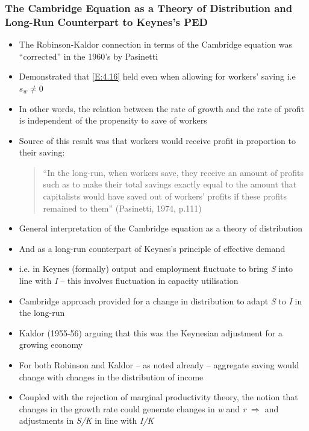 \documentclass[a4paper,twoside]{article}
\numberwithin{equation}{section}
\numberwithin{figure}{section}
\begin{document}
\subsubsection{The Cambridge Equation as a Theory of Distribution and Long-Run Counterpart to Keynes's PED}
	\begin{itemize}
		\item The Robinson-Kaldor connection in terms of the Cambridge equation was ``corrected'' in the 1960's by Pasinetti
		\item Demonstrated that \cref{E:4.16} held even when allowing for workers' saving i.e \( s_w \neq 0 \)
		\item In other words, the relation between the rate of growth and the rate of profit is independent of the propensity to save of workers
		\item Source of this result was that workers would receive profit in proportion to their saving:
		\begin{quote}
			``In the long-run, when workers save, they receive an amount of profits such as to make their total savings exactly equal to the amount that capitalists would have saved out of workers' profits if these profits remained to them'' (Pasinetti, 1974, p.111)
		\end{quote}
			\item General interpretation of the Cambridge equation as a theory of distribution
		\item And as a long-run counterpart of Keynes's principle of effective demand
		\item i.e. in Keynes (formally) output and employment fluctuate to bring \textit{S} into line with \textit{I} -- this involves fluctuation in capacity utilisation
		\item Cambridge approach provided for a change in distribution to adapt \textit{S} to \textit{I} in the long-run
		\item Kaldor (1955-56) arguing that this was the Keynesian adjustment for a growing economy 
		\item For both Robinson and Kaldor -- as noted already -- aggregate saving would change with changes in the distribution of income
		\item Coupled with the rejection of marginal productivity theory, the notion that changes in the growth rate could generate changes in \textit{w} and \textit{r} \( \Rightarrow \) and adjustments in \textit{S/K} in line with \textit{I/K}
	\end{itemize}
\end{document}
